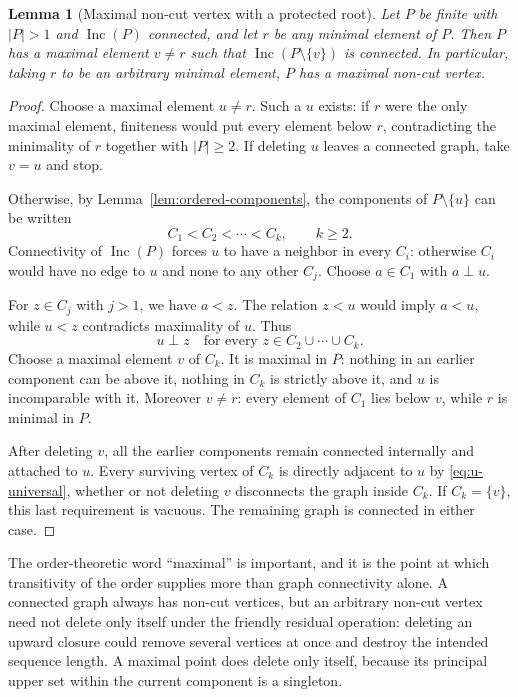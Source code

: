 \documentclass[11pt,letterpaper]{article}
\newtheorem{lemma}[theorem]{Lemma}
\theoremstyle{definition}
\theoremstyle{remark}
\newcommand{\Inc}{\operatorname{Inc}}
\begin{document}
\begin{lemma}[Maximal non-cut vertex with a protected root]\label{lem:noncut}
Let $P$ be finite with $|P|>1$ and $\Inc(P)$ connected, and let $r$ be any
minimal element of $P$. Then $P$ has a maximal element $v\ne r$ such that
$\Inc(P\setminus\{v\})$ is connected. In particular, taking $r$ to be an
arbitrary minimal element, $P$ has a maximal non-cut vertex.
\end{lemma}
\begin{proof}
Choose a maximal element $u\ne r$. Such a $u$ exists: if $r$ were the only
maximal element, finiteness would put every element below $r$, contradicting
the minimality of $r$ together with $|P|\ge2$. If deleting $u$ leaves a
connected graph, take $v=u$ and stop.

Otherwise, by Lemma~\ref{lem:ordered-components},
the components of $P\setminus\{u\}$ can be written
\[
 C_1<C_2<\cdots<C_k,\qquad k\ge2.
\]
Connectivity of $\Inc(P)$ forces $u$ to have a neighbor in every $C_i$:
otherwise $C_i$ would have no edge to $u$ and none to any other $C_j$.
Choose $a\in C_1$ with $a\perp u$.

For $z\in C_j$ with $j>1$, we have $a<z$. The relation $z<u$ would imply
$a<u$, while $u<z$ contradicts maximality of $u$. Thus
\begin{equation}\label{eq:u-universal}
 u\perp z\quad\text{for every }z\in C_2\cup\cdots\cup C_k.
\end{equation}
Choose a maximal element $v$ of $C_k$. It is maximal in $P$: nothing in an
earlier component can be above it, nothing in $C_k$ is strictly above it,
and $u$ is incomparable with it. Moreover $v\ne r$: every element of $C_1$
lies below $v$, while $r$ is minimal in $P$.

After deleting $v$, all the earlier components remain connected internally
and attached to $u$. Every surviving vertex of $C_k$ is directly adjacent
to $u$ by \eqref{eq:u-universal}, whether or not deleting $v$ disconnects
the graph inside $C_k$. If $C_k=\{v\}$, this last requirement is
vacuous. The remaining graph is connected in either case.
\end{proof}

The order-theoretic word ``maximal'' is important, and it is the point at
which transitivity of the order supplies more than graph connectivity alone.
A connected graph always has non-cut vertices, but an arbitrary non-cut
vertex need not delete only itself under the friendly residual operation:
deleting an upward closure could remove several vertices at once and destroy
the intended sequence length. A maximal point does delete only itself,
because its principal upper set within the current component is a singleton.
\end{document}
